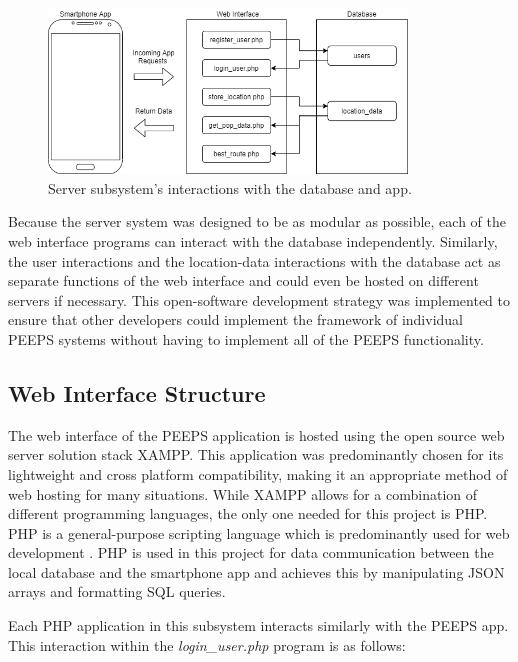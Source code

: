 \begin{figure}[ht]
    \centering
    \includegraphics[width=0.85\textwidth]{figures/ServerSubsystemInteraction.png}
    \caption{Server subsystem's interactions with the database and app.}
    \label{fig:server_subsystem_interaction}
\end{figure}

Because the server system was designed to be as modular as possible, each of the web interface programs can interact with the database independently. Similarly, the user interactions and the location-data interactions with the database act as separate functions of the web interface and could even be hosted on different servers if necessary. This open-software development strategy was implemented to ensure that other developers could implement the framework of individual PEEPS systems without having to implement all of the PEEPS functionality.

\subsection{Web Interface Structure}
\label{sec:web_interface}
The web interface of the PEEPS application is hosted using the open source web server solution stack XAMPP. This application was predominantly chosen for its lightweight and cross platform compatibility, making it an appropriate method of web hosting for many situations. While XAMPP allows for a combination of different programming languages, the only one needed for this project is PHP. PHP is a general-purpose scripting language which is predominantly used for web development \cite{ThePHPGroup}. PHP is used in this project for data communication between the local database and the smartphone app and achieves this by manipulating JSON arrays and formatting SQL queries. 

Each PHP application in this subsystem interacts similarly with the PEEPS app. This interaction within the \textit{login\_user.php} program is as follows:

